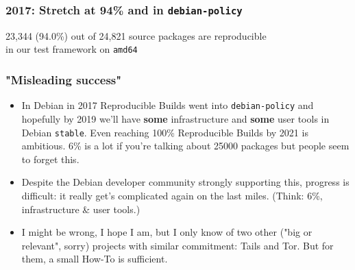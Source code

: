 \documentclass[14pt,aspectratio=169]{beamer}
\newif\ifplacelogo
\begin{document}
\placelogotrue

\begin{frame}
 \frametitle{2017: Stretch at 94\% and in \texttt{debian-policy}}
 \begin{center}
  \footnotesize{23,344 (94.0\%) out of 24,821 source packages are reproducible \\
    in our test framework on \texttt{amd64}}
  \vfill
 \end{center}
\end{frame}

\placelogotrue

\begin{frame}
 \frametitle{"Misleading success"}
 \begin{itemize}
	 \item<2-4> In Debian in 2017 Reproducible Builds went into \texttt{debian-policy} and hopefully by 2019 we'll have \textbf{some} infrastructure and \textbf{some} user tools in Debian \texttt{stable}. Even reaching 100\% Reproducible Builds by 2021 is ambitious. 6\% is a lot if you're talking about 25000 packages but people seem to forget this.
	 \item<3-4> Despite the Debian developer community strongly supporting this, progress is difficult: it really get's complicated again on the last miles. (Think: 6\%, infrastructure \& user tools.)
	 \item<4> I might be wrong, I hope I am, but I only know of two other ("big or relevant", sorry) projects with similar commitment: Tails and Tor. But for them, a small How-To is sufficient.
 \end{itemize}
\end{frame}
\end{document}
